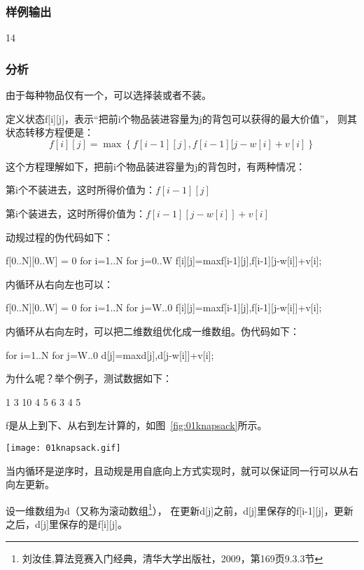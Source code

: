 \subsubsection{样例输出}
\begin{Code}
14
\end{Code}

\subsubsection{分析}
由于每种物品仅有一个，可以选择装或者不装。

定义状态f[i][j]，表示“把前i个物品装进容量为j的背包可以获得的最大价值”，
则其状态转移方程便是：
$$f[i][j]=\max\left\{f[i-1][j], f[i-1][j-w[i]+v[i]\right\}$$

这个方程理解如下，把前i个物品装进容量为j的背包时，有两种情况：
\begindot
\item 第i个不装进去，这时所得价值为：$f[i-1][j]$
\item 第i个装进去，这时所得价值为：$f[i-1][j-w[i]]+v[i]$
\myenddot

动规过程的伪代码如下：
\begin{Code}
f[0..N][0..W] = 0
for i=1..N
    for j=0..W
        f[i][j]=max{f[i-1][j],f[i-1][j-w[i]]+v[i]};
\end{Code}

内循环从右向左也可以：
\begin{Code}
f[0..N][0..W] = 0
for i=1..N
    for j=W..0
        f[i][j]=max{f[i-1][j],f[i-1][j-w[i]]+v[i]};
\end{Code}

内循环从右向左时，可以把二维数组优化成一维数组。伪代码如下：
\begin{Code}
for i=1..N
    for j=W..0
        d[j]=max{d[j],d[j-w[i]]+v[i]};
\end{Code}

为什么呢？举个例子，测试数据如下：
\begin{Code}
1
3 10
4 5 6
3 4 5
\end{Code}

f是从上到下、从右到左计算的，如图~\ref{fig:01knapsack}所示。
\begin{center}
\texttt{[image: 01knapsack.gif]}\\
\label{fig:01knapsack}
\end{center}

当内循环是逆序时，且动规是用自底向上方式实现时，就可以保证同一行可以从右向左更新。

设一维数组为d（又称为滚动数组\footnote{刘汝佳,算法竞赛入门经典，清华大学出版社，2009，第169页9.3.3节}），
在更新d[j]之前，d[j]里保存的f[i-1][j]，更新之后，d[j]里保存的是f[i][j]。


